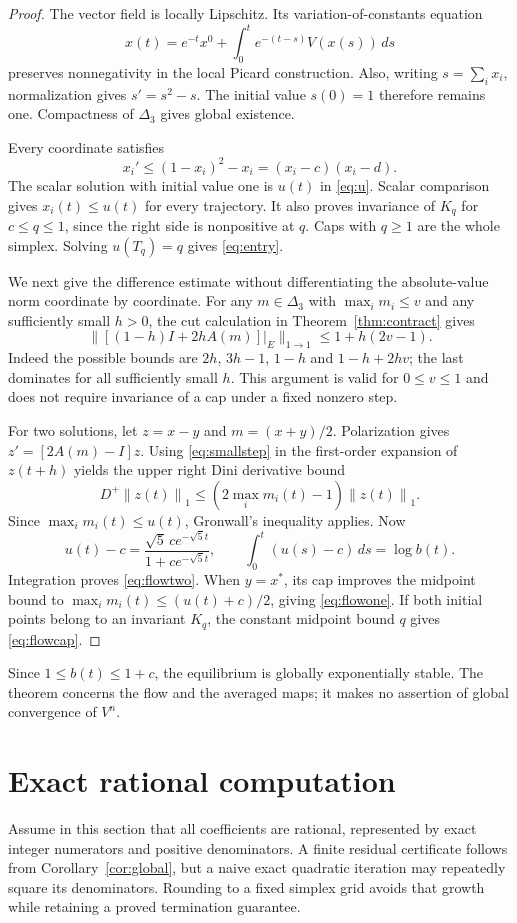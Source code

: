 \documentclass[11pt]{amsart}
\theoremstyle{definition}
\newcommand{\D}{\Delta_3}
\newcommand{\norm}[1]{\left\lVert#1\right\rVert_1}
\begin{document}
\begin{proof}
The vector field is locally Lipschitz. Its variation-of-constants equation
\[
 x(t)=e^{-t}x^0+\int_0^t e^{-(t-s)}V(x(s))\,ds
\]
preserves nonnegativity in the local Picard construction. Also, writing $s=\sum_i x_i$, normalization gives $s'=s^2-s$. The initial value $s(0)=1$ therefore remains one. Compactness of $\D$ gives global existence.

Every coordinate satisfies
\[
 x_i'\le (1-x_i)^2-x_i=(x_i-c)(x_i-d).
\]
The scalar solution with initial value one is $u(t)$ in \eqref{eq:u}. Scalar comparison gives $x_i(t)\le u(t)$ for every trajectory. It also proves invariance of $K_q$ for $c\le q\le1$, since the right side is nonpositive at $q$. Caps with $q\ge1$ are the whole simplex. Solving $u(T_q)=q$ gives \eqref{eq:entry}.

We next give the difference estimate without differentiating the absolute-value norm coordinate by coordinate. For any $m\in\D$ with $\max_i m_i\le v$ and any sufficiently small $h>0$, the cut calculation in Theorem~\ref{thm:contract} gives
\begin{equation}\label{eq:smallstep}
 \|[(1-h)I+2hA(m)]|_E\|_{1\to1}
 \le1+h(2v-1).
\end{equation}
Indeed the possible bounds are $2h$, $3h-1$, $1-h$ and $1-h+2hv$; the last dominates for all sufficiently small $h$. This argument is valid for $0\le v\le1$ and does not require invariance of a cap under a fixed nonzero step.

For two solutions, let $z=x-y$ and $m=(x+y)/2$. Polarization gives $z'=[2A(m)-I]z$. Using \eqref{eq:smallstep} in the first-order expansion of $z(t+h)$ yields the upper right Dini derivative bound
\[
 D^+\norm{z(t)}\le(2\max_i m_i(t)-1)\norm{z(t)}.
\]
Since $\max_i m_i(t)\le u(t)$, Gronwall's inequality applies. Now
\[
 u(t)-c=\frac{\sqrt5\,c e^{-\sqrt5t}}{1+c e^{-\sqrt5t}},
 \qquad \int_0^t(u(s)-c)\,ds=\log b(t).
\]
Integration proves \eqref{eq:flowtwo}. When $y=x^*$, its cap improves the midpoint bound to $\max_i m_i(t)\le(u(t)+c)/2$, giving \eqref{eq:flowone}. If both initial points belong to an invariant $K_q$, the constant midpoint bound $q$ gives \eqref{eq:flowcap}.
\end{proof}

Since $1\le b(t)\le1+c$, the equilibrium is globally exponentially stable. The theorem concerns the flow and the averaged maps; it makes no assertion of global convergence of $V^n$.

\section{Exact rational computation}\label{sec:algorithm}
Assume in this section that all coefficients are rational, represented by exact integer numerators and positive denominators. A finite residual certificate follows from Corollary~\ref{cor:global}, but a naive exact quadratic iteration may repeatedly square its denominators. Rounding to a fixed simplex grid avoids that growth while retaining a proved termination guarantee.
\end{document}

